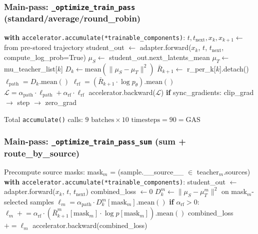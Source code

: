 \documentclass[11pt]{article}
\begin{document}
\subsubsection{Main-pass: \texttt{\_optimize\_train\_pass} (standard/average/round\_robin)}

\begin{algorithm}[H]
\caption{OPD Main-pass (standard)}
\begin{algorithmic}
    \STATE \textbf{with} \texttt{accelerator.accumulate(*trainable\_components)}:
    \STATE \quad $t, t_\text{next}, x_k, x_{k+1} \leftarrow$ from pre-stored trajectory
    \STATE \quad student\_out $\leftarrow$ adapter.forward($x_k$, $t$, $t_\text{next}$, compute\_log\_prob=True)
    \STATE \quad $\mu_S \leftarrow$ student\_out.next\_latents\_mean 
    \STATE \quad $\mu_T \leftarrow$ mu\_teacher\_list[$k$] 
    \STATE \quad $D_k \leftarrow \text{mean}(\|\mu_S - \mu_T\|^2)$
    \STATE \quad $\bar{R}_{k+1} \leftarrow$ r\_per\_k[$k$].detach()
    \STATE \quad $\ell_\text{path} = D_k.\text{mean}()$
    \STATE \quad $\ell_\text{rf} = (\bar{R}_{k+1} \cdot \log p_\theta).\text{mean}()$
    \STATE \quad $\mathcal{L} = \alpha_\text{path} \cdot \ell_\text{path} + \alpha_\text{rf} \cdot \ell_\text{rf}$ 
    \STATE \quad accelerator.backward($\mathcal{L}$) 
    \STATE \quad \textbf{if} sync\_gradients: clip\_grad $\to$ step $\to$ zero\_grad
\ENDFOR
\end{algorithmic}
\end{algorithm}

Total \texttt{accumulate()} calls: $9 \text{ batches} \times 10 \text{ timesteps} = 90 = \text{GAS}$ \checkmark

\subsubsection{Main-pass: \texttt{\_optimize\_train\_pass\_sum} (sum + route\_by\_source)}

\begin{algorithm}[H]
\caption{OPD Main-pass (sum mode)}
\begin{algorithmic}
\STATE Precompute source masks: mask$_m$ = (sample.\_\_source\_\_ $\in$ teacher$_m$.sources)
    \STATE \textbf{with} \texttt{accelerator.accumulate(*trainable\_components)}:
    \STATE \quad student\_out $\leftarrow$ adapter.forward($x_k$, $t$, $t_\text{next}$)
    \STATE \quad combined\_loss $\leftarrow 0$
        \STATE \quad $D_k^m \leftarrow \|\mu_S - \mu_T^m\|^2$ on mask$_m$-selected samples
        \STATE \quad $\ell_m = \alpha_\text{path} \cdot D_k^m[\text{mask}_m].\text{mean}()$
        \STATE \quad \textbf{if} $\alpha_\text{rf} > 0$: $\ell_m \mathrel{+}= \alpha_\text{rf} \cdot (\bar{R}^m_{k+1}[\text{mask}_m] \cdot \log p[\text{mask}_m]).\text{mean}()$
        \STATE \quad combined\_loss $\mathrel{+}= \ell_m$
    \ENDFOR
    \STATE \quad accelerator.backward(combined\_loss)
\ENDFOR
\end{algorithmic}
\end{algorithm}
\end{document}
